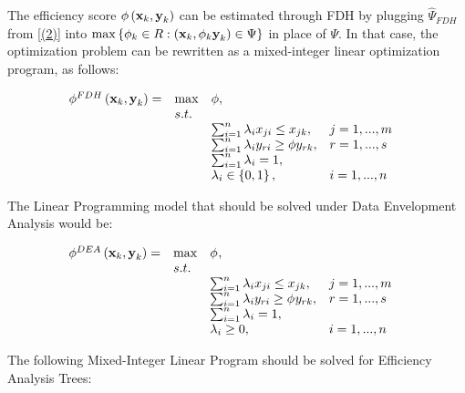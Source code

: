 The efficiency score
\(\phi \left({\it \textbf{x}}_{k}, {\it \textbf{y}}_{k} \right)\) can be
estimated through FDH by plugging \(\hat{\Psi }_{FDH}\) from \eqref{(2)}
into
\(\max \left\{\phi _{k} \in R:\left({\it \textbf{x}}_{k} ,\phi _{k} {\it \textbf{y}}_{k} \right)\in \Psi \right\}\)
in place of \(\Psi\). In that case, the optimization problem can be
rewritten as a mixed-integer linear optimization program, as follows:

\begin{equation} \label{(10)} 
\begin{array}{lllll} 
{\phi ^{FDH} \left({\it \textbf{x}}_{k} ,{\it \textbf{y}}_{k} \right)=} & {\max } & {\phi,} & {} & {} \\ 
{} & {s.t.} & {} & {} & {} \\ 
{} & {} & {\sum_{i=1}^{n}\lambda_{i} x_{ji} \le x_{jk} ,} & {j=1,...,m} & {} \\ 
{} & {} & {\sum_{i=1}^{n}\lambda_{i} y_{ri} \ge \phi y_{rk} ,} & {r=1,...,s} & {} \\ 
{} & {} & {\sum_{i=1}^{n}\lambda_{i} = 1,} & {} & {} \\ 
{} & {} & {\lambda _{i} \in \left\{0,1\right\},} & {i=1,...,n} & {} 
\end{array} 
\end{equation}

The Linear Programming model that should be solved under Data
Envelopment Analysis would be:

\begin{equation} \label{(11)} 
\begin{array}{lllll} 
{\phi ^{DEA} \left({\it \textbf{x}}_{k} ,{\it \textbf{y}}_{k} \right)=} & {\max } & {\phi_{}, } & {} & {} \\ 
{} & {s.t.} & {} & {} & {} \\ 
{} & {} & {\sum_{i=1}^{n}\lambda_{i} x_{ji}  \le x_{jk} ,} & {j=1,...,m} & {} \\ 
{} & {} & {\sum_{i=1}^{n}\lambda_{i} y_{ri}  \ge \phi_{} y_{rk} ,} & {r=1,...,s} & {} \\ 
{} & {} & {\sum_{i=1}^{n}\lambda_{i}  =1,} & {} & {} \\ 
{} & {} & {\lambda _{i} \ge 0,} & {i=1,...,n} & {} 
\end{array} 
\end{equation}

The following Mixed-Integer Linear Program should be solved for
Efficiency Analysis Trees:

